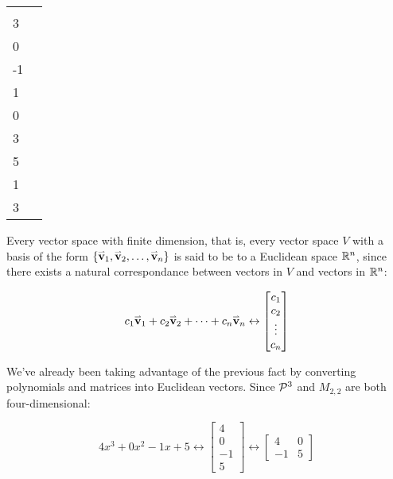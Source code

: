 \begin{activity}{10}
\begin{center}
\begin{tabular}{ll}
 &
     \(\vspan\left\{
    \begin{bmatrix}5\\3\\0\\-1\end{bmatrix},
    \begin{bmatrix}-2\\1\\0\\3\end{bmatrix},
    \begin{bmatrix}4\\5\\1\\3\end{bmatrix}
    \right\}
	\)
\end{tabular}
\end{center}
\end{activity}

\begin{fact}
  Every vector space with finite dimension, that is, every
  vector space \(V\) with a basis of the form
  \(\{\vect v_1,\vect v_2,\dots,\vect v_n\}\) is said to be
   to a Euclidean space \(\IR^n\), since there exists
  a natural correspondance between vectors in \(V\) and vectors in \(\IR^n\):

  \[
    c_1\vect v_1+c_2\vect v_2+\dots+c_n\vect v_n
    \leftrightarrow
    \begin{bmatrix}
      c_1\\c_2\\\vdots\\c_n
    \end{bmatrix}
  \]
\end{fact}

\begin{observation}
  We've already been taking advantage of the previous fact by converting
  polynomials and matrices into Euclidean vectors. Since \(\P^3\)
  and \(M_{2,2}\) are both four-dimensional:

  \[
    4x^3+0x^2-1x+5
    \leftrightarrow
    \begin{bmatrix}
      4\\0\\-1\\5
    \end{bmatrix}
    \leftrightarrow
    \begin{bmatrix}
      4&0\\-1&5
    \end{bmatrix}
  \]
\end{observation}

